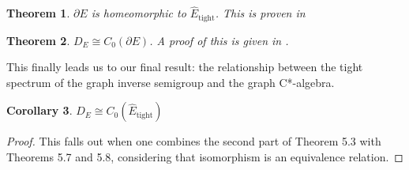 \documentclass[12pt]{article}
\newtheorem{theorem}{Theorem}[section]
\newtheorem{corollary}[theorem]{Corollary}
\theoremstyle{definition}
\begin{document}
\begin{theorem} $\partial E$ is homeomorphic to $\hat{E}_\text{tight}$. \emph{This is proven in \cite[Example 6.8]{boava}} \end{theorem}

\begin{theorem} $D_E \cong C_0(\partial E)$. \emph{A proof of this is given in \cite[Theorem 3.7]{webster}.} \end{theorem}

This finally leads us to our final result: the relationship between the tight 
spectrum of the graph inverse semigroup and the graph C*-algebra.
\begin{corollary} $D_E \cong C_0(\hat{E}_\text{tight})$ \end{corollary}
\begin{proof}
    This falls out when one combines the second part of Theorem 5.3 with Theorems 5.7 and 5.8,
    considering that isomorphism is an equivalence relation.
\end{proof}

\printbibliography
\end{document}
